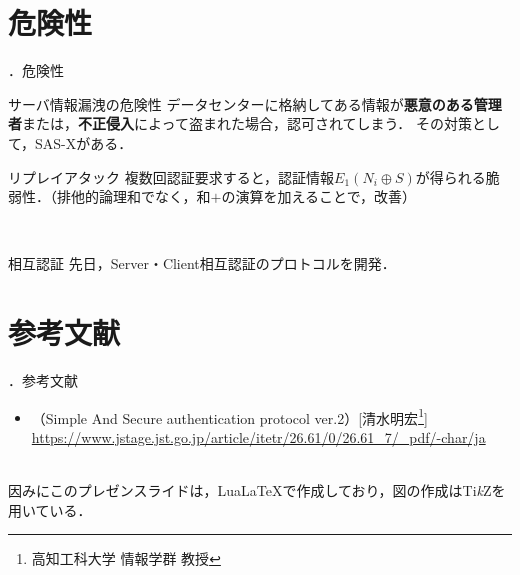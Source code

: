 \documentclass[aspectratio=43]{beamer}
\newcommand{\showsec}{\thesection ．}
\begin{document}
\section{危険性}
\begin{frame}{\showsec 危険性}
    \begin{block}{サーバ情報漏洩の危険性}
        データセンターに格納してある情報が\textbf{悪意のある管理者}または，\textbf{不正侵入}によって盗まれた場合，認可されてしまう．
        その対策として，SAS-Xがある．
    \end{block}
    \begin{block}{リプレイアタック}
        複数回認証要求すると，認証情報\(E_1(N_i\oplus S)\)が得られる脆弱性．（排他的論理和でなく，和\(+\)の演算を加えることで，改善）
    \end{block}
    \dotfill\\
    \begin{block}{相互認証}
        先日，{\ttfamily Server}・{\ttfamily Client}相互認証のプロトコルを開発．
    \end{block}
\end{frame}
\section{参考文献}
\begin{frame}{\thesection ．参考文献}
    \begin{itemize}
        \item （Simple And Secure authentication protocol ver.2）[清水明宏\footnote{高知工科大学 情報学群 教授}]\\
              \url{https://www.jstage.jst.go.jp/article/itetr/26.61/0/26.61_7/_pdf/-char/ja}

    \end{itemize}
    \dotfill\\
    因みにこのプレゼンスライドは，Lua\LaTeX で作成しており，図の作成はTi{\it k}Zを用いている．
\end{frame}
\end{document}
